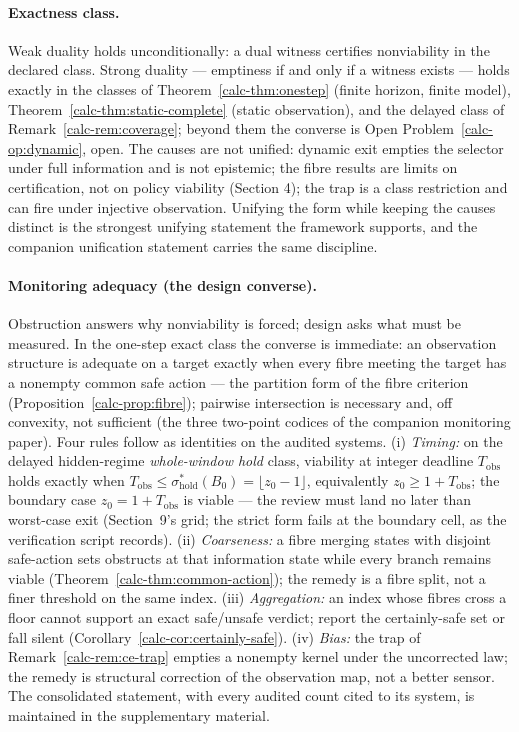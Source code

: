 \documentclass[10pt,twocolumn]{article}
\theoremstyle{definition}
\begin{document}
\paragraph{Exactness class.} Weak duality holds unconditionally: a dual witness certifies nonviability in the declared class. Strong duality --- emptiness if and only if a witness exists --- holds exactly in the classes of Theorem~\ref{calc-thm:onestep} (finite horizon, finite model), Theorem~\ref{calc-thm:static-complete} (static observation), and the delayed class of Remark~\ref{calc-rem:coverage}; beyond them the converse is Open Problem~\ref{calc-op:dynamic}, open. The causes are not unified: dynamic exit empties the selector under full information and is not epistemic; the fibre results are limits on certification, not on policy viability (Section 4); the trap is a class restriction and can fire under injective observation. Unifying the form while keeping the causes distinct is the strongest unifying statement the framework supports, and the companion unification statement carries the same discipline.

\paragraph{Monitoring adequacy (the design converse).} Obstruction answers why nonviability is forced; design asks what must be measured. In the one-step exact class the converse is immediate: an observation structure is adequate on a target exactly when every fibre meeting the target has a nonempty common safe action --- the partition form of the fibre criterion (Proposition~\ref{calc-prop:fibre}); pairwise intersection is necessary and, off convexity, not sufficient (the three two-point codices of the companion monitoring paper). Four rules follow as identities on the audited systems. (i) \emph{Timing:} on the delayed hidden-regime \emph{whole-window hold} class, viability at integer deadline \(T_{\mathrm{obs}}\) holds exactly when \(T_{\mathrm{obs}} \le \sigma^{*}_{\mathrm{hold}}(B_{0}) = \lfloor z_{0} - 1\rfloor\), equivalently \(z_{0} \ge 1 + T_{\mathrm{obs}}\); the boundary case \(z_{0} = 1 + T_{\mathrm{obs}}\) is viable --- the review must land no later than worst-case exit (Section~9's grid; the strict form fails at the boundary cell, as the verification script records). (ii) \emph{Coarseness:} a fibre merging states with disjoint safe-action sets obstructs at that information state while every branch remains viable (Theorem~\ref{calc-thm:common-action}); the remedy is a fibre split, not a finer threshold on the same index. (iii) \emph{Aggregation:} an index whose fibres cross a floor cannot support an exact safe/unsafe verdict; report the certainly-safe set or fall silent (Corollary~\ref{calc-cor:certainly-safe}). (iv) \emph{Bias:} the trap of Remark~\ref{calc-rem:ce-trap} empties a nonempty kernel under the uncorrected law; the remedy is structural correction of the observation map, not a better sensor. The consolidated statement, with every audited count cited to its system, is maintained in the supplementary material.
\end{document}
